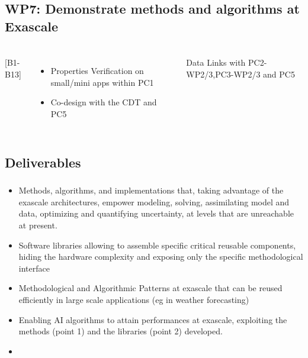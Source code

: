 \subsection{WP7: Demonstrate methods and algorithms at Exascale}
\begin{frame}
  \frametitle{\insertsectionhead}
  \framesubtitle{\insertsubsectionhead}

  \begin{columns}
    [B1-B13]
    \begin{itemize}
      \item Properties Verification on small/mini apps within PC1
      \item Co-design with the CDT and PC5
    \end{itemize}
    \begin{alertblock}{Data }
      Links with PC2-WP2/3,PC3-WP2/3 and PC5
    \end{alertblock}
   
  \end{columns}
\end{frame}

\subsection{Deliverables}

\begin{frame}
  \frametitle{\insertsectionhead}
  \framesubtitle{\insertsubsectionhead}
  \begin{itemize}
    \item  Methods, algorithms, and implementations that, taking advantage of the exascale architectures, empower modeling, solving, assimilating model and data, optimizing and quantifying uncertainty, at levels that are unreachable at present.
    \item Software libraries allowing to assemble specific critical reusable components, hiding the hardware complexity and exposing only the specific methodological interface
    \item Methodological and Algorithmic Patterns at exascale that can be reused efficiently in large scale applications (eg in weather forecasting)
    \item Enabling AI algorithms to attain performances at exascale, exploiting the methods (point 1) and the libraries (point 2) developed.
    \item \href{https://docs.google.com/document/d/1hjwSFRF63SyTUJJKGMNLHcJPr_S2JDHYXeBeQzHCSno/edit?usp=sharing}{}

  \end{itemize}


\end{frame}

